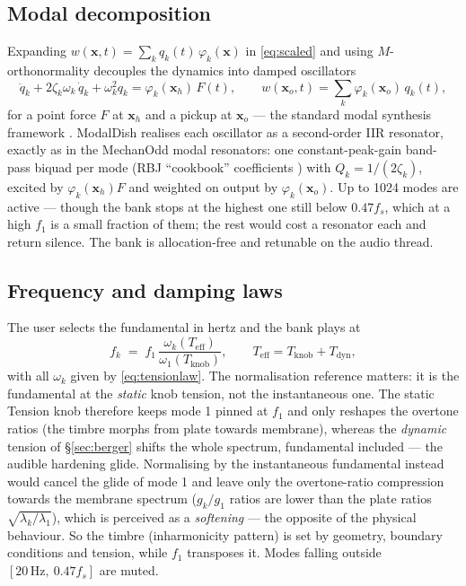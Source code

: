 \documentclass[11pt,a4paper]{article}
\begin{document}
\subsection{Modal decomposition}

Expanding $w(\bm{x},t) = \sum_k q_k(t)\, \varphi_k(\bm{x})$ in
\eqref{eq:scaled} and using $M$-orthonormality decouples the dynamics into
damped oscillators
%
\begin{equation}
  \ddot q_k + 2\zeta_k \omega_k\, \dot q_k + \omega_k^2 q_k
  = \varphi_k(\bm{x}_h)\, F(t),
  \qquad
  w(\bm{x}_o, t) = \sum_k \varphi_k(\bm{x}_o)\, q_k(t),
  \label{eq:modal}
\end{equation}
%
for a point force $F$ at $\bm{x}_h$ and a pickup at $\bm{x}_o$ --- the
standard modal synthesis framework \cite{adrien,morrison,vandendoel,bilbao}.
ModalDish realises each oscillator as a second-order IIR resonator, exactly
as in the MechanOdd modal resonators: one constant-peak-gain band-pass
biquad per mode (RBJ ``cookbook'' coefficients \cite{rbj}) with
$Q_k = 1/(2\zeta_k)$, excited by $\varphi_k(\bm{x}_h) F$ and weighted on
output by $\varphi_k(\bm{x}_o)$. Up to 1024 modes are active --- though the
bank stops at the highest one still below $0.47 f_s$, which at a high $f_1$
is a small fraction of them; the rest would cost a resonator each and
return silence. The bank is
allocation-free and retunable on the audio thread.

\subsection{Frequency and damping laws}
\label{sec:damping}

The user selects the fundamental in hertz and the bank plays at
%
\begin{equation}
  f_k \;=\; f_1\,
  \frac{\omega_k(T_{\mathrm{eff}})}{\omega_1(T_{\mathrm{knob}})} ,
  \qquad T_{\mathrm{eff}} = T_{\mathrm{knob}} + T_{\mathrm{dyn}} ,
  \label{eq:freqmap}
\end{equation}
%
with all $\omega_k$ given by \eqref{eq:tensionlaw}. The normalisation
reference matters: it is the fundamental at the \emph{static} knob tension,
not the instantaneous one. The static Tension knob therefore keeps mode 1
pinned at $f_1$ and only reshapes the overtone ratios (the timbre morphs
from plate towards membrane), whereas the \emph{dynamic} tension of
\S\ref{sec:berger} shifts the whole spectrum, fundamental included --- the
audible hardening glide. Normalising by the instantaneous fundamental
instead would cancel the glide of mode 1 and leave only the overtone-ratio
compression towards the membrane spectrum ($g_k/g_1$ ratios are lower than
the plate ratios $\sqrt{\lambda_k/\lambda_1}$), which is perceived as a
\emph{softening} --- the opposite of the physical behaviour. So the timbre
(inharmonicity pattern) is set by geometry, boundary conditions and
tension, while $f_1$ transposes it. Modes falling outside
$[20\,\mathrm{Hz},\ 0.47 f_s]$ are muted.
\end{document}
